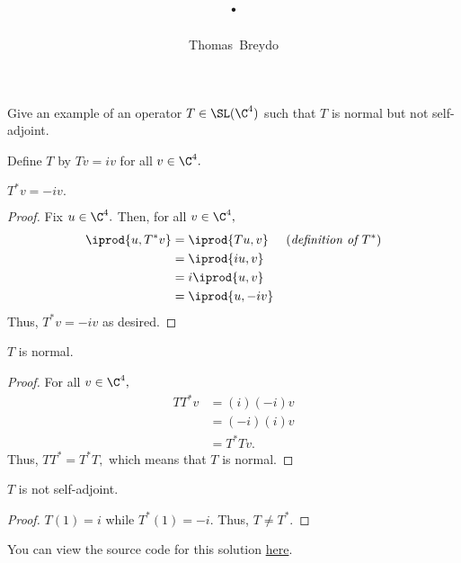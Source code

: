 \documentclass{amsart}
\title{\pagenum.\probnum}
\author{Thomas\ Breydo}
\newcommand{\pagenum}{215}
\newcommand{\probnum}{13}
\begin{document}
\maketitle

\begin{problem*}
Give an example of an operator $T\in\SL(\C^4)$ such that $T$ is
normal but not self-adjoint.
\end{problem*}

\vspace{0.5in}

Define $T$ by $Tv=iv$ for all $v\in\C^4.$
\begin{claim*}
$T^*v=-iv.$
\end{claim*}
\begin{proof}
Fix $u\in\C^4.$ Then, for all $v\in\C^4,$
\begin{align*}
    \iprod{u, T^*v}
    &= \iprod{Tu, v} &&(\textit{definition of $T^*$})\\
    &= \iprod{iu, v} \\
    &= i\iprod{u, v} \\ 
    &= \iprod{u, -iv}
\end{align*}
Thus, $T^*v=-iv$ as desired.
\end{proof}

\begin{claim*}
$T$ is normal.
\end{claim*}
\begin{proof}
For all $v\in\C^4,$
\begin{align*}
    TT^*v &= (i)(-i)v \\
          &= (-i)(i)v \\
          &= T^*Tv.
\end{align*}
Thus, $TT^*=T^*T,$ which means that $T$ is normal.
\end{proof}

\begin{claim*}
$T$ is not self-adjoint.
\end{claim*}
\begin{proof}
$T(1)=i$ while $T^*(1)=-i.$ Thus, $T\ne T^*.$
\end{proof}

\vspace{0.5in}

\begin{note*}
You can view the source code for this solution
\href{https://github.com/thomasbreydo/linalg/blob/main/\pagenum_\probnum_Thomas_Breydo.tex}
{here}.
\end{note*}
\end{document}
